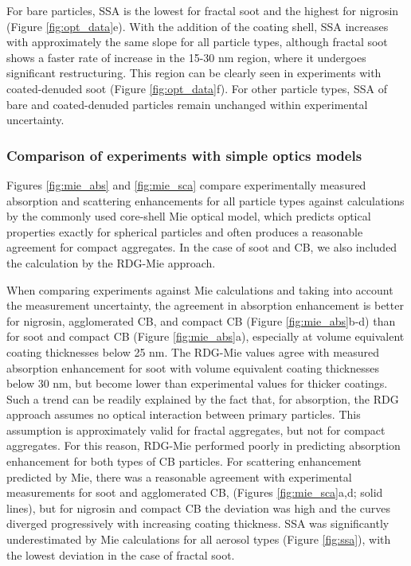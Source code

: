 For bare particles, SSA is the lowest for fractal soot and the highest for nigrosin (Figure \ref{fig:opt_data}e). With the addition of the coating shell, SSA increases with approximately the same slope for all particle types, although fractal soot shows a faster rate of increase in the 15-30 nm region, where it undergoes significant restructuring. This region can be clearly seen in experiments with coated-denuded soot (Figure \ref{fig:opt_data}f). For other particle types, SSA of bare and coated-denuded particles remain unchanged within experimental uncertainty.


\subsubsection{Comparison of experiments with simple optics models}

Figures \ref{fig:mie_abs} and \ref{fig:mie_sca} compare experimentally measured absorption and scattering enhancements for all particle types against calculations by the commonly used core-shell Mie optical model, which predicts optical properties exactly for spherical particles and often produces a reasonable agreement for compact aggregates. In the case of soot and CB, we also included the calculation by the RDG-Mie approach.


When comparing experiments against Mie calculations and taking into account the measurement uncertainty, the agreement in absorption enhancement is better for nigrosin, agglomerated CB, and compact CB (Figure \ref{fig:mie_abs}b-d) than for soot and compact CB (Figure \ref{fig:mie_abs}a), especially at volume equivalent coating thicknesses below 25 nm. The RDG-Mie values agree with measured absorption enhancement for soot with volume equivalent coating thicknesses below 30 nm, but become lower than experimental values for thicker coatings. Such a trend can be readily explained by the fact that, for absorption, the RDG approach assumes no optical interaction between primary particles. This assumption is approximately valid for fractal aggregates, but not for compact aggregates. For this reason, RDG-Mie performed poorly in predicting absorption enhancement for both types of CB particles. For scattering enhancement predicted by Mie, there was a reasonable agreement with experimental measurements for soot and agglomerated CB, (Figures \ref{fig:mie_sca}a,d; solid lines), but for nigrosin and compact CB the deviation was high and the curves diverged progressively with increasing coating thickness. SSA was significantly underestimated by Mie calculations for all aerosol types (Figure \ref{fig:ssa}), with the lowest deviation in the case of fractal soot.

